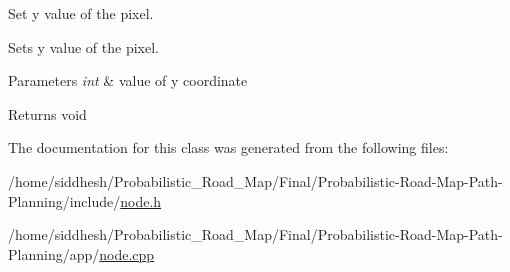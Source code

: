 Set y value of the pixel. 

Sets y value of the pixel.


\begin{DoxyParams}{Parameters}
{\em int} & value of y coordinate \\
\hline
\end{DoxyParams}
\begin{DoxyReturn}{Returns}
void 
\end{DoxyReturn}


The documentation for this class was generated from the following files\+:\begin{DoxyCompactItemize}
\item 
/home/siddhesh/\+Probabilistic\+\_\+\+Road\+\_\+\+Map/\+Final/\+Probabilistic-\/\+Road-\/\+Map-\/\+Path-\/\+Planning/include/\mbox{\hyperlink{node_8h}{node.\+h}}\item 
/home/siddhesh/\+Probabilistic\+\_\+\+Road\+\_\+\+Map/\+Final/\+Probabilistic-\/\+Road-\/\+Map-\/\+Path-\/\+Planning/app/\mbox{\hyperlink{node_8cpp}{node.\+cpp}}\end{DoxyCompactItemize}
